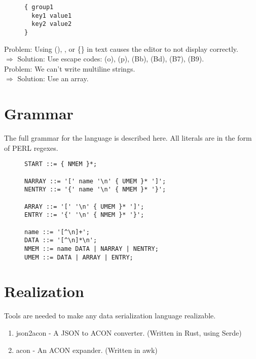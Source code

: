 \documentclass[listof=totoc]{article}
\begin{document}
\begin{figure}[H]
\centering
\begin{varwidth}{\linewidth}
\begin{verbatim}
{ group1
  key1 value1
  key2 value2
}
\end{verbatim}
\end{varwidth}
\caption{}
\end{figure}

\noindent Problem: Using (), \lbrack \rbrack, or \{\} in text causes the editor to not display correctly. \\
$\Rightarrow$ Solution: Use escape codes: (o), (p), (Bb), (Bd), (B7), (B9). \\
\noindent Problem: We can't write multiline strings. \\
$\Rightarrow$ Solution: Use an array.

\section{Grammar}
\noindent The full grammar for the language is described here. All literals are in the form of PERL regexes.


\begin{figure}[H]
\centering
\begin{varwidth}{\linewidth}
\begin{verbatim}
START ::= { NMEM }*;

NARRAY ::= '[' name '\n' { UMEM }* ']';
NENTRY ::= '{' name '\n' { NMEM }* '}';

ARRAY ::= '[' '\n' { UMEM }* ']';
ENTRY ::= '{' '\n' { NMEM }* '}';

name ::= '[^\n]+';
DATA ::= '[^\n]*\n';
NMEM ::= name DATA | NARRAY | NENTRY;
UMEM ::= DATA | ARRAY | ENTRY;
\end{verbatim}
\end{varwidth}
\caption{}
\end{figure}

\section{Realization}
\noindent Tools are needed to make any data serialization language realizable.

\begin{enumerate}
  \item json2acon - A JSON to ACON converter. (Written in Rust, using Serde)
  \item acon - An ACON expander. (Written in awk)
\end{enumerate}
\end{document}
